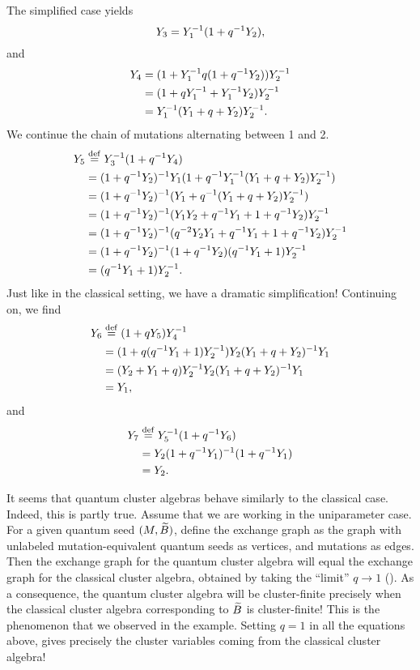 The simplified case yields
\begin{equation*}
	Y_3 = Y_1^{-1} (1 + q^{-1} Y_2),
\end{equation*}
and
\begin{align*}
	Y_4
	 & = (1 + Y_1 ^{-1} q (1 + q^{-1} Y_2))Y_2^{-1} \\
	 & = (1 + q Y_1^{-1} + Y_1^{-1} Y_2)Y_2^{-1}    \\
	 & = Y_1^{-1} (Y_1 + q + Y_2)Y_2^{-1}.
\end{align*}
%
We continue the chain of mutations alternating between 1 and 2.
\begin{align*}
	Y_5
	 & \overset{\mathrm{def}}{=} Y_3^{-1} (1 + q^{-1} Y_4)                                             \\
	 & = (1 + q^{-1} Y_2)^{-1} Y_1 (1 + q^{-1} Y_1^{-1}( Y_1 + q + Y_2)Y_2^{-1})       \\
	 & = (1 + q^{-1} Y_2)^{-1}  (Y_1 + q^{-1} ( Y_1 + q + Y_2)Y_2^{-1})               \\
	 & = (1 + q^{-1} Y_2)^{-1}  (Y_1 Y_2 + q^{-1} Y_1 + 1 + q^{-1} Y_2)Y_2^{-1}        \\
	 & = (1 + q^{-1} Y_2)^{-1}  (q^{-2} Y_2 Y_1 + q^{-1} Y_1 + 1 + q^{-1} Y_2)Y_2^{-1} \\
	 & = (1 + q^{-1} Y_2)^{-1}  (1 + q^{-1} Y_2)(q^{-1} Y_1 + 1)Y_2^{-1}               \\
	 & = (q^{-1} Y_1 + 1)Y_2^{-1}.
\end{align*}
%
Just like in the classical setting, we have a dramatic simplification! Continuing on,
we find
\begin{align*}
	Y_6
	 & \overset{\mathrm{def}}{=} (1 + q Y_5)Y_4 ^{-1}                                 \\
	 & = (1 + q(q^{-1} Y_1 + 1)Y_2^{-1})Y_2 (Y_1 + q + Y_2)^{-1} Y_1 \\
	 & = (Y_2 +  Y_1 + q)Y_2^{-1} Y_2 (Y_1 + q + Y_2)^{-1} Y_1      \\
	 & = Y_1,
\end{align*}
%
and
\begin{align*}
	Y_7 & \overset{\mathrm{def}}{=} Y_5^{-1} (1 + q^{-1} Y_6)            \\
	    & = Y_2 (1 + q^{-1} Y_1)^{-1} (1 + q^{-1} Y_1) \\
	    & = Y_2.
\end{align*}
%

It seems that quantum cluster algebras behave similarly to the classical case. Indeed,
this is partly true. Assume that we are working in the uniparameter case. For a given
quantum seed $(M, \widetilde{B})$, define the exchange graph as the graph with unlabeled
mutation-equivalent quantum seeds as vertices, and mutations as edges. Then the
exchange graph for the quantum cluster algebra will equal the exchange graph for the
classical cluster algebra, obtained by taking the ``limit'' $q \to 1$ (\cite[Theorem
	6.1]{BerensteinZelevinsky2005QCA}). As a consequence, the quantum cluster algebra will
be cluster-finite precisely when the classical cluster algebra corresponding to $\widetilde{B}$
is cluster-finite! This is the phenomenon that we observed in the example. Setting $q =
	1$ in all the equations above, gives precisely the cluster variables coming from the
classical cluster algebra!

